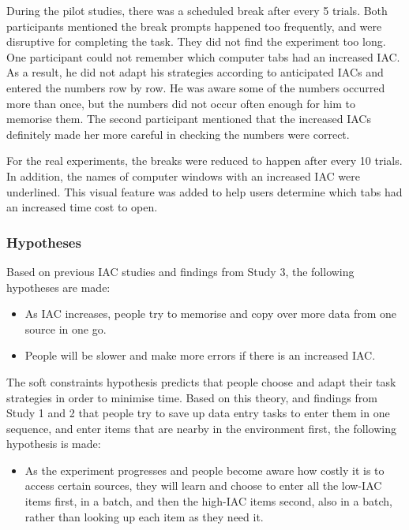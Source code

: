 \begin{table}
\begin{enumerate}
During the pilot studies, there was a scheduled break after every 5 trials. Both participants mentioned the break prompts happened too frequently, and were disruptive for completing the task. They did not find the experiment too long. One participant could not remember which computer tabs had an increased IAC. As a result, he did not adapt his strategies according to anticipated IACs and entered the numbers row by row. He was aware some of the numbers occurred more than once, but the numbers did not occur often enough for him to memorise them. The second participant mentioned that the increased IACs definitely made her more careful in checking the numbers were correct.

For the real experiments, the breaks were reduced to happen after every 10 trials. In addition, the names of computer windows with an increased IAC were underlined. This visual feature was added to help users determine which tabs had an increased time cost to open.

\subsubsection{Hypotheses}
Based on previous IAC studies and findings from Study 3, the following hypotheses are made: 
\begin{itemize}
\item
As IAC increases, people try to memorise and copy over more data from one source in one go. 
\item
People will be slower and make more errors if there is an increased IAC.
\end{itemize}
The soft constraints hypothesis predicts that people choose and adapt their task strategies in order to minimise time. Based on this theory, and findings from Study 1 and 2 that people try to save up data entry tasks to enter them in one sequence, and enter items that are nearby in the environment first, the following hypothesis is made: 
\begin{itemize}
\item 
As the experiment progresses and people become aware how costly it is to access certain sources, they will learn and choose to enter all the low-IAC items first, in a batch, and then the high-IAC items second, also in a batch, rather than looking up each item as they need it. 
\end{itemize}


\end{enumerate}
\end{table}
